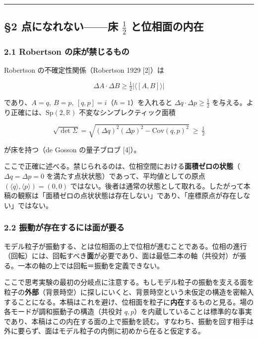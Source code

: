 \documentclass[
]{ltjsarticle}
\begin{document}
\begin{center}\rule{0.5\linewidth}{0.5pt}\end{center}

\subsection{\texorpdfstring{§2 点になれない------床 \(\tfrac12\)
と位相面の内在}{§2 点になれない------床 \textbackslash tfrac12 と位相面の内在}}\label{ux70b9ux306bux306aux308cux306aux3044ux5e8a-tfrac12-ux3068ux4f4dux76f8ux9762ux306eux5185ux5728}

\subsubsection{2.1 Robertson
の床が禁じるもの}\label{robertson-ux306eux5e8aux304cux7981ux3058ux308bux3082ux306e}

Robertson の不確定性関係（Robertson 1929 {[}2{]}）は

\[\Delta A\cdot\Delta B \ge \tfrac12\bigl|\langle[A,B]\rangle\bigr|\]

であり、\(A=q,\ B=p,\ [q,p]=i\)（\(\hbar=1\)）を入れると
\(\Delta q\cdot\Delta p\ge\tfrac12\)
を与える。より正確には、\(\mathrm{Sp}(2,\mathbb{R})\)
不変なシンプレクティック面積

\[\sqrt{\det\Sigma}=\sqrt{(\Delta q)^2(\Delta p)^2-\mathrm{Cov}(q,p)^2}\ \ge\ \tfrac12\]

が床を持つ（de Gosson の量子ブロブ {[}4{]}）。

ここで正確に述べる。禁じられるのは、位相空間における\textbf{面積ゼロの状態}（\(\Delta q=\Delta p=0\)
を満たす点状状態）であって、平均値としての原点
\((\langle q\rangle,\langle p\rangle)=(0,0)\)
ではない。後者は通常の状態として取れる。したがって本稿の観察は「面積ゼロの点状状態は存在しない」であり、「座標原点が存在しない」ではない。

\subsubsection{2.2
振動が存在するには面が要る}\label{ux632fux52d5ux304cux5b58ux5728ux3059ux308bux306bux306fux9762ux304cux8981ux308b}

モデル粒子が振動する、とは位相面の上で位相が進むことである。位相の進行（回転）には、回転すべき\textbf{面}が必要であり、面は最低二本の軸（共役対）が張る。一本の軸の上では回転＝振動を定義できない。

ここで思考実験の最初の分岐点に注意する。もしモデル粒子の振動を支える面を粒子の\textbf{外部}（背景時空）に探しにいくと、背景時空という未仮定の構造を密輸入することになる。本稿はこれを避け、位相面を粒子に\textbf{内在}するものと見る。場の各モードが調和振動子の構造（共役対
\(q,p\)）を内蔵していることは標準的な事実であり、本稿はこの内在する面の上で振動を読む。すなわち、振動を回す相手は外に要らず、面はモデル粒子の内側に初めから在ると仮定する。
\end{document}
